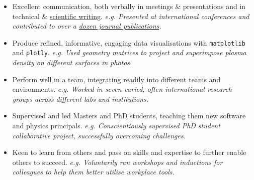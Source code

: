 \documentclass[12pt,a4paper,sans]{moderncv}        %
\begin{document}
{\begin{itemize}%
\item Excellent communication, both verbally in \textcolor{mypurple}{meetings \& presentations} and in \textcolor{mypurple}{technical \& \href{https://orcid.org/0000-0003-2307-6019}{scientific writing}}.
\newline
\textit{e.g. Presented at international conferences and contributed to over a \href{https://orcid.org/0000-0003-2307-6019}{dozen journal publications}.}
\item Produce refined, informative, engaging \textcolor{mypurple}{data visualisations} with \texttt{matplotlib} and \texttt{plotly}.\newline
\textit{e.g. Used geometry matrices to project and superimpose plasma density on different surfaces in photos.}%
\end{itemize}}


{\begin{itemize}%
\item Perform well in a team, integrating readily into \textcolor{mypurple}{different teams and environments}. \newline
\textit{e.g. Worked in seven varied, often international research groups across different labs and institutions.}
\item \textcolor{mypurple}{Supervised} and led Masters and PhD students, teaching them new software and physics principals. \newline
\textit{e.g. Conscientiously supervised PhD student collaborative project, successfully overcoming challenges.}
\item Keen to \textcolor{mypurple}{learn from others} and \textcolor{mypurple}{pass on skills} and expertise to further enable others to succeed. \newline
\textit{e.g. Voluntarily ran workshops and inductions for colleagues to help them better utilise workplace tools.}
\end{itemize}}

\end{document}
